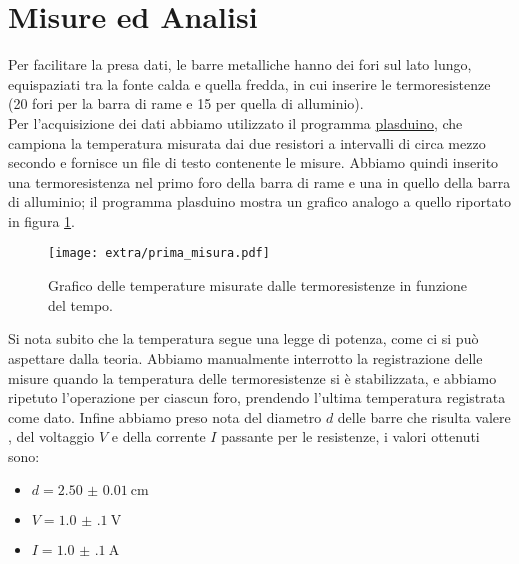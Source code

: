 \documentclass{article}
\begin{document}
    \section{Misure ed Analisi}
    Per facilitare la presa dati, le barre metalliche hanno dei fori sul lato lungo,
    equispaziati tra la fonte calda e quella fredda, in cui inserire le termoresistenze
    (20 fori per la barra di rame e 15 per quella di alluminio).\\
    Per l'acquisizione dei dati abbiamo utilizzato il programma \href{https://pythonhosted.org/plasduino/index.html}{plasduino},
    che campiona la temperatura misurata dai due resistori a intervalli di circa mezzo secondo
    e fornisce  un file di testo contenente le misure.
    Abbiamo quindi inserito una termoresistenza nel primo foro della barra di rame
    e una in quello della barra di alluminio; il programma plasduino mostra un grafico
    analogo a quello riportato in figura \ref{fig:prima_misura}.
    \begin{figure}[t]
        \centering
        \texttt{[image: extra/prima\_misura.pdf]}
        \caption{Grafico delle temperature misurate dalle termoresistenze in funzione del tempo.}
        \label{fig:prima_misura}
    \end{figure}
    Si nota subito che la temperatura segue una legge di potenza, come ci si può aspettare
    dalla teoria. Abbiamo manualmente interrotto la registrazione delle misure quando la
    temperatura delle termoresistenze si è stabilizzata, e abbiamo ripetuto l'operazione
    per ciascun foro, prendendo l'ultima temperatura registrata come dato.
    Infine abbiamo preso nota del diametro $d$ delle barre che risulta valere 
    , del voltaggio $V$ e della corrente $I$ passante per le resistenze,
    i valori ottenuti sono:
    \begin{itemize}
        \item $d=\SI{2.50(1)}{\cm}$
        \item $V=\SI{1.0(1)}{\volt}$
        \item $I=\SI{1.0(1)}{\ampere}$
    \end{itemize}
\end{document}
